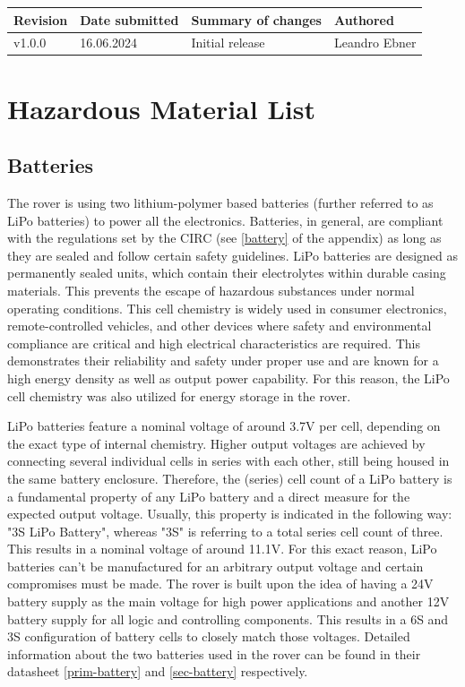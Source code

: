     \begin{table}[b]
        \centering
        \begin{tabular}{|l|l|l|l|} \hline 
             Revision&  Date submitted& Summary of changes  &Authored \\ \hline 
             v1.0.0&  16.06.2024& Initial release  &Leandro Ebner \\ \hline
        \end{tabular}
    \end{table}

    \clearpage                   
\section{Hazardous Material List}

    \subsection{Batteries}
    
    The rover is using two lithium-polymer based batteries (further referred to as LiPo batteries) to power all the electronics. Batteries, in general, are compliant with the regulations set by the CIRC (see \ref{battery} of the appendix) as long as they are sealed and follow certain safety guidelines. LiPo batteries are designed as permanently sealed units, which contain their electrolytes within durable casing materials. This prevents the escape of hazardous substances under normal operating conditions. This cell chemistry is widely used in consumer electronics, remote-controlled vehicles, and other devices where safety and environmental compliance are critical and high electrical characteristics are required. This demonstrates their reliability and safety under proper use and are known for a high energy density as well as output power capability. For this reason, the LiPo cell chemistry was also utilized for energy storage in the rover.
    
    \vspace{5mm}
    
    LiPo batteries feature a nominal voltage of around 3.7V per cell, depending on the exact type of internal chemistry. Higher output voltages are achieved by connecting several individual cells in series with each other, still being housed in the same battery enclosure. Therefore, the (series) cell count of a LiPo battery is a fundamental property of any LiPo battery and a direct measure for the expected output voltage. Usually, this property is indicated in the following way: "3S LiPo Battery", whereas "3S" is referring to a total series cell count of three. This results in a nominal voltage of around 11.1V. For this exact reason, LiPo batteries can't be manufactured for an arbitrary output voltage and certain compromises must be made. The rover is built upon the idea of having a 24V battery supply as the main voltage for high power applications and another 12V battery supply for all logic and controlling components. This results in a 6S and 3S configuration of battery cells to closely match those voltages. Detailed information about the two batteries used in the rover can be found in their datasheet \ref{prim-battery} and \ref{sec-battery} respectively.

